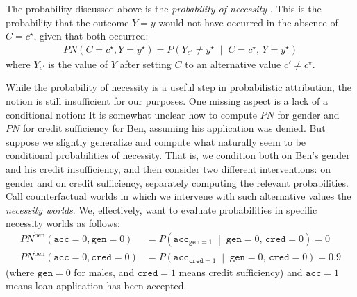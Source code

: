\documentclass[anon,12pt]{clear2025} %
\newcommand{\pn}{\ensuremath{\mathit{PN}}}
\begin{document}
The probability discussed above is the \emph{probability of necessity} \cite{pearl2022probabilities}.
This is the probability that the outcome $Y=y$ would not have occurred in the absence of  $C = c^\star$, given that both occurred: 
\begin{align*}
\pn(C = c^\star, Y = y^\star) 
  = P\!\left(Y_{c'} \neq y^\star \;\middle|\; C = c^\star,\, Y = y^\star\right)
\end{align*}
where $Y_{c'}$ is the value of $Y$ after setting $C$ to an alternative value $c'\neq c^\star$.

While the probability of necessity is a useful step in probabilistic attribution, the notion is still insufficient for our purposes. One missing aspect is a lack of a conditional notion:
It is somewhat unclear how to compute $PN$ for gender and $PN$ for credit sufficiency for Ben, assuming his application was denied. But suppose we slightly generalize and compute what naturally seem to be conditional probabilities of necessity. That is, we condition both on Ben's gender and his credit insufficiency, and then consider two different interventions: on gender and on credit sufficiency, separately computing the relevant probabilities. Call counterfactual worlds in which we intervene with such alternative values the \emph{necessity worlds}. We, effectively, want to evaluate probabilities in specific necessity worlds as follows:
\begin{align*}
\mathit{PN}^{\text{ben}}(\mathtt{acc} = 0, \mathtt{gen} = 0) 
  &= P\!\left(
      \mathtt{acc}_{\mathtt{gen} = 1} \;\middle|\;
      \mathtt{gen} = 0,\, \mathtt{cred} = 0
    \right) = 0 \\
\mathit{PN}^{\text{ben}}(\mathtt{acc} = 0, \mathtt{cred} = 0) 
  &= P\!\left(
      \mathtt{acc}_{\mathtt{cred} = 1} \;\middle|\;
      \mathtt{gen} = 0,\, \mathtt{cred} = 0
    \right) = 0.9
\end{align*}
\noindent (where  $\mathtt{gen} = 0$ for males, and $\mathtt{cred} = 1$ means credit sufficiency) and $\mathtt{acc}=1$ means loan application has been accepted.
\end{document}
